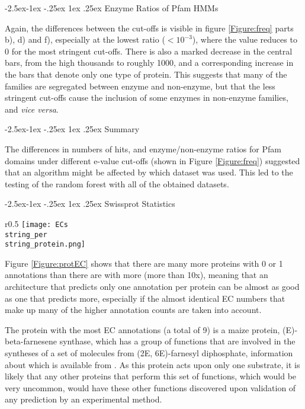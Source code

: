 \documentclass[12pt]{article}
\makeatletter
\renewcommand\paragraph{\@startsection{paragraph}{4}{\z@}
            {-2.5ex\@plus -1ex \@minus -.25ex}
            {1ex \@plus .25ex}
            {\normalfont\normalsize\bfseries}}
\renewcommand\subsubsection{\@startsection{subsubsection}{4}{\z@}
            {-2.5ex\@plus -1ex \@minus -.25ex}
            {1ex \@plus .25ex}
            {\normalfont\large\bfseries}}
\makeatother
\begin{document}
			\paragraph{Enzyme Ratios of Pfam HMMs}
			
			Again, the differences between the cut-offs is visible in figure \ref{Figure:freq} parts b), d) and f), especially at the lowest ratio ($<10^{-3}$), where the value reduces to 0 for the most stringent cut-offs.  There is also a marked decrease in the central bars, from the high thousands to roughly 1000, and a corresponding increase in the bars that denote only one type of protein.  This suggests that many of the families are segregated between enzyme and non-enzyme, but that the less stringent cut-offs cause the inclusion of some enzymes in non-enzyme families, and \textit{vice versa}.
			
			\paragraph{Summary}
			
			The differences in numbers of hits, and enzyme/non-enzyme ratios for Pfam domains under different e-value cut-offs (shown in Figure \ref{Figure:freq}) suggested that an algorithm might be affected by which dataset was used. This led to the testing of the random forest with all of the obtained datasets.
						
			\subsubsection{Swissprot Statistics}
			
			\begin{wrapfigure}{r}{0.5\textwidth}
			\texttt{[image: ECs\\string\_per\\string\_protein.png]}
			\caption{Plot showing the distribution of numbers of EC annotations per protein.  Many proteins have a few EC annotations, but it rapidly falls off at higher numbers}		
			\label{Figure:protEC}
			\end{wrapfigure}
			
			Figure \ref{Figure:protEC} shows that there are many more proteins with 0 or 1 annotations than there are with more (more than 10x), meaning that an architecture that predicts only one annotation per protein can be almost as good as one that predicts more, especially if the almost identical EC numbers that make up many of the higher annotation counts are taken into account.
			
			The protein with the most EC annotations (a total of 9) is a maize protein, (E)-beta-farnesene synthase, which has a group of functions that are involved in the syntheses of a set of molecules from (2E, 6E)-farnesyl diphosphate, information about which is available from \cite{RefWorks:doc:5d80d882e4b074875bbeabb7}.  As this protein acts upon only one substrate, it is likely that any other proteins that perform this set of functions, which would be very uncommon, would have these other functions discovered upon validation of any prediction by an experimental method.
			
\end{document}
